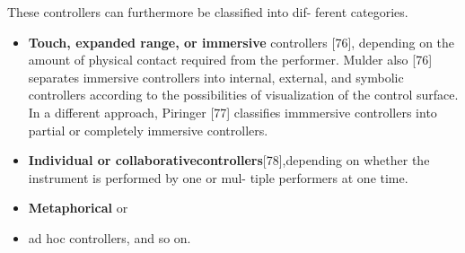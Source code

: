 These controllers can furthermore be classified into dif- ferent categories.
\begin{itemize}[noitemsep]
\item \textbf{Touch, expanded range, or immersive} controllers [76], depending on the amount of physical contact required from the performer. Mulder also [76] separates immersive controllers into internal, external, and symbolic controllers according to the possibilities of visualization of the control surface. In a different approach, Piringer [77] classifies immmersive controllers into partial or completely immersive controllers.
\item \textbf{Individual or collaborativecontrollers}[78],depending on whether the instrument is performed by one or mul- tiple performers at one time.
\item \textbf{Metaphorical} or \item{ad hoc} controllers, and so on.
\end{itemize}